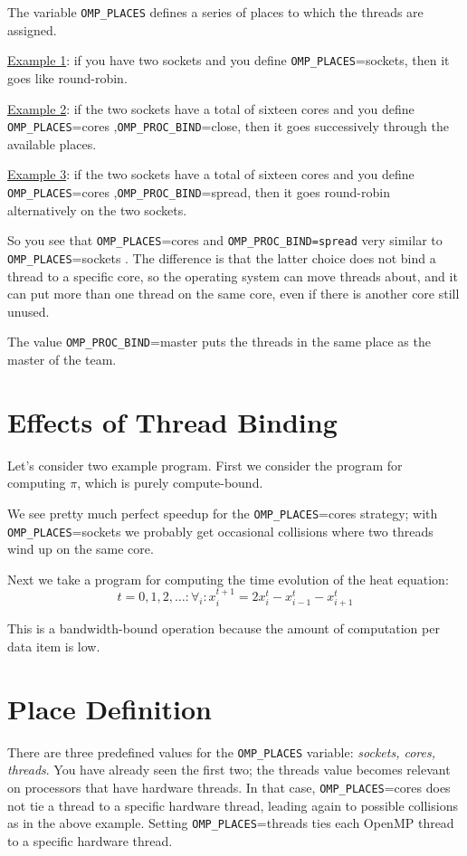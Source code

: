 \documentclass[11pt]{book} %
\begin{document}
The variable \verb|OMP_PLACES| defines a series of places to which the threads are assigned.

\underline{Example 1}: if you have two sockets and you define \verb|OMP_PLACES|=sockets, then it goes like round-robin.

\underline{Example 2}: if the two sockets have a total of sixteen cores and you define
\verb|OMP_PLACES|=cores ,\verb|OMP_PROC_BIND|=close, then it goes successively through the available places.

\underline{Example 3}: if the two sockets have a total of sixteen cores and you define
\verb|OMP_PLACES|=cores ,\verb|OMP_PROC_BIND|=spread, then it goes round-robin alternatively on the two sockets.

So you see that \verb|OMP_PLACES|=cores and \verb|OMP_PROC_BIND=spread| very similar to \verb|OMP_PLACES|=sockets . The difference is that the latter choice does not bind a thread to a specific core, so the operating system can move threads about, and it can put more than one thread on the same core, even if there is another core still unused.

The value \verb|OMP_PROC_BIND|=master puts the threads in the same place as the master of the team.

\section{Effects of Thread Binding}

Let's consider two example program. First we consider the program for computing $\pi$, which is purely compute-bound.

We see pretty much perfect speedup for the \verb|OMP_PLACES|=cores strategy; with \verb|OMP_PLACES|=sockets we probably get occasional collisions where two threads wind up on the same core.




Next we take a program for computing the time evolution of the heat equation:
\[
t=0,1,2,…:\forall_i : x_i^{t+1} = 2x_i^t - x_{i-1}^t - x_{i+1}^t
\]

This is a bandwidth-bound operation because the amount of computation per data item is low.



\section{Place Definition}

There are three predefined values for the \verb|OMP_PLACES| variable: \emph{sockets, cores, threads}. You have already seen the first two; the threads value becomes relevant on processors that have hardware threads. In that case, \verb|OMP_PLACES|=cores does not tie a thread to a specific hardware thread, leading again to possible collisions as in the above example. Setting \verb|OMP_PLACES|=threads ties each OpenMP thread to a specific hardware thread.
\end{document}
